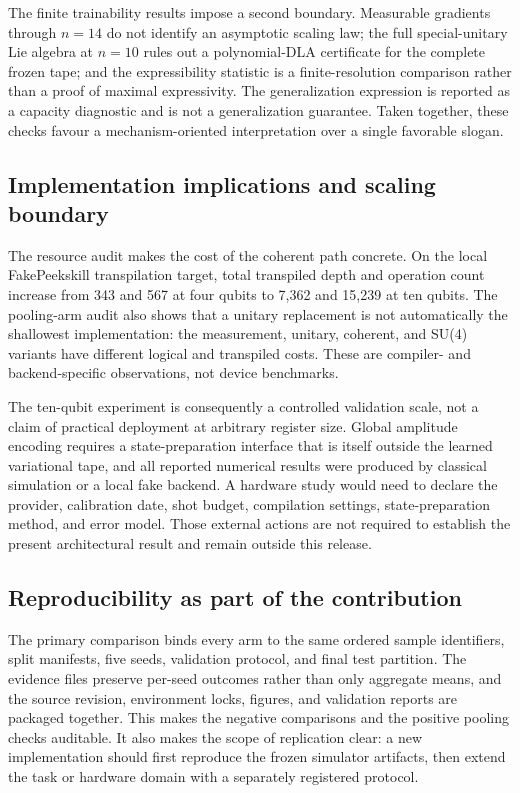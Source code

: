 \documentclass[conference]{IEEEtran}
\begin{document}
The finite trainability results impose a second boundary. Measurable gradients
through $n=14$ do not identify an asymptotic scaling law; the full
special-unitary Lie algebra at $n=10$ rules out a polynomial-DLA certificate
for the complete frozen tape; and the expressibility statistic is a
finite-resolution comparison rather than a proof of maximal expressivity.
The generalization expression is reported as a capacity diagnostic and is
not a generalization guarantee. Taken together, these checks favour a
mechanism-oriented interpretation over a single favorable slogan.

\subsection{Implementation implications and scaling boundary}
The resource audit makes the cost of the coherent path concrete. On the local
FakePeekskill transpilation target, total transpiled depth and operation count
increase from 343 and 567 at four qubits to 7,362 and 15,239 at ten qubits.
The pooling-arm audit also shows that a unitary replacement is not automatically
the shallowest implementation: the measurement, unitary, coherent, and SU(4)
variants have different logical and transpiled costs. These are compiler- and
backend-specific observations, not device benchmarks.

The ten-qubit experiment is consequently a controlled validation scale, not a
claim of practical deployment at arbitrary register size. Global amplitude
encoding requires a state-preparation interface that is itself outside the
learned variational tape, and all reported numerical results were produced by
classical simulation or a local fake backend. A hardware study would need to
declare the provider, calibration date, shot budget, compilation settings,
state-preparation method, and error model. Those external actions are not
required to establish the present architectural result and remain outside this
release.

\subsection{Reproducibility as part of the contribution}
The primary comparison binds every arm to the same ordered sample identifiers,
split manifests, five seeds, validation protocol, and final test partition.
The evidence files preserve per-seed outcomes rather than only aggregate
means, and the source revision, environment locks, figures, and validation
reports are packaged together. This makes the negative comparisons and the
positive pooling checks auditable. It also makes the scope of replication
clear: a new implementation should first reproduce the frozen simulator
artifacts, then extend the task or hardware domain with a separately registered
protocol.
\end{document}
